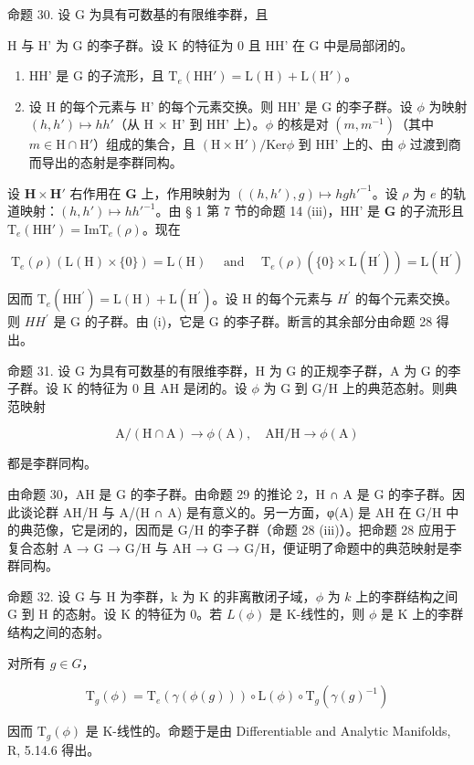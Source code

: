 命题 30. 设 G 为具有可数基的有限维李群，且

H 与 H' 为 G 的李子群。设 K 的特征为 0 且 HH' 在 G 中是局部闭的。

\begin{enumerate}
\def\labelenumi{(\roman{enumi})}
\item
  HH' 是 G 的子流形，且 \(\mathrm{T}_{e}(\mathrm{HH}') = \mathrm{L}(\mathrm{H}) + \mathrm{L}(\mathrm{H}')\)。
\item
  设 H 的每个元素与 H' 的每个元素交换。则 HH' 是 G 的李子群。设 \(\phi\) 为映射 \((h, h') \mapsto hh'\)（从 H \(\times\) H' 到 HH' 上）。\(\phi\) 的核是对 \((m, m^{-1})\)（其中 \(m \in \mathrm{H} \cap \mathrm{H}'\)）组成的集合，且 \((\mathrm{H} \times \mathrm{H}') / \mathrm{Ker} \phi\) 到 HH' 上的、由 \(\phi\) 过渡到商而导出的态射是李群同构。
\end{enumerate}

设 \(\mathbf{H} \times \mathbf{H}'\) 右作用在 \(\mathbf{G}\) 上，作用映射为 \(((h, h'), g) \mapsto hgh'^{-1}\)。设 \(\rho\) 为 \(e\) 的轨道映射：\((h, h') \mapsto hh'^{-1}\)。由 § 1 第 7 节的命题 14 (iii)，HH' 是 \(\mathbf{G}\) 的子流形且 \(\mathrm{T}_e(\mathrm{HH}') = \mathrm{Im} \mathrm{T}_e(\rho)\)。现在

\[
\mathrm{T} _ {e} (\rho) (\mathrm{L} (\mathrm{H}) \times \{0 \}) = \mathrm{L} (\mathrm{H}) \quad \text { and } \quad \mathrm{T} _ {e} (\rho) (\{0 \} \times \mathrm{L} (\mathrm{H} ^ {\prime})) = \mathrm{L} (\mathrm{H} ^ {\prime})
\]

因而 \(\mathrm{T}_{e}(\mathrm{HH}^{\prime})=\mathrm{L}(\mathrm{H})+\mathrm{L}(\mathrm{H}^{\prime})\)。设 H 的每个元素与 \(H^{\prime}\) 的每个元素交换。则 \(HH^{\prime}\) 是 G 的子群。由 (i)，它是 G 的李子群。断言的其余部分由命题 28 得出。

命题 31. 设 G 为具有可数基的有限维李群，H 为 G 的正规李子群，A 为 G 的李子群。设 K 的特征为 0 且 AH 是闭的。设 \(\phi\) 为 G 到 G/H 上的典范态射。则典范映射

\[
\mathrm{A} / (\mathrm{H} \cap \mathrm{A}) \rightarrow \phi (\mathrm{A}), \quad \mathrm{AH} / \mathrm{H} \rightarrow \phi (\mathrm{A})
\]

都是李群同构。

由命题 30，AH 是 G 的李子群。由命题 29 的推论 2，H ∩ A 是 G 的李子群。因此谈论群 AH/H 与 A/(H ∩ A) 是有意义的。另一方面，φ(A) 是 AH 在 G/H 中的典范像，它是闭的，因而是 G/H 的李子群（命题 28 (iii)）。把命题 28 应用于复合态射 A → G → G/H 与 AH → G → G/H，便证明了命题中的典范映射是李群同构。

命题 32. 设 G 与 H 为李群，k 为 K 的非离散闭子域，\(\phi\) 为 \(k\) 上的李群结构之间 G 到 H 的态射。设 K 的特征为 0。若 \(L(\phi)\) 是 K-线性的，则 \(\phi\) 是 K 上的李群结构之间的态射。

对所有 \(g \in G\)，

\[
\mathrm{T} _ {g} (\phi) = \mathrm{T} _ {e} (\gamma (\phi (g))) \circ \mathrm{L} (\phi) \circ \mathrm{T} _ {g} (\gamma (g) ^ {- 1})
\]

因而 \(\mathrm{T}_g(\phi)\) 是 K-线性的。命题于是由 Differentiable and Analytic Manifolds, R, 5.14.6 得出。

